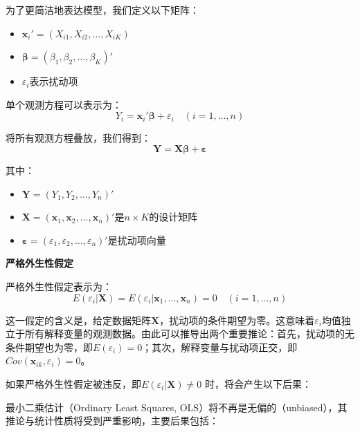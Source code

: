 为了更简洁地表达模型，我们定义以下矩阵：
\begin{itemize}
\item $\mathbf{x}_i' = (X_{i1}, X_{i2}, \ldots, X_{iK})$
\item $\boldsymbol{\beta} = (\beta_1, \beta_2, \ldots, \beta_K)'$
\item $\varepsilon_i$表示扰动项
\end{itemize}

单个观测方程可以表示为：
\begin{equation}
Y_i = \mathbf{x}_i' \boldsymbol{\beta} + \varepsilon_i \quad (i=1,\ldots,n) 
\end{equation}

将所有观测方程叠放，我们得到：
\begin{equation}
\mathbf{Y} = \mathbf{X} \boldsymbol{\beta} + \boldsymbol{\varepsilon}
\end{equation}

其中：
\begin{itemize}
\item $\mathbf{Y} = (Y_1, Y_2, \ldots, Y_n)'$
\item $\mathbf{X} = (\mathbf{x}_1, \mathbf{x}_2, \ldots, \mathbf{x}_n)'$是$n \times K$的设计矩阵
\item $\boldsymbol{\varepsilon} = (\varepsilon_1, \varepsilon_2, \ldots, \varepsilon_n)'$是扰动项向量
\end{itemize}

\textbf{严格外生性假定}

严格外生性假定表示为：
\begin{equation}
E(\varepsilon_i | \mathbf{X}) = E(\varepsilon_i | \mathbf{x}_1, \ldots, \mathbf{x}_n) = 0 \quad (i=1,\ldots,n)
\end{equation}

这一假定的含义是，给定数据矩阵$\mathbf{X}$，扰动项的条件期望为零。这意味着$\varepsilon_i$均值独立于所有解释变量的观测数据。由此可以推导出两个重要推论：首先，扰动项的无条件期望也为零，即$E(\varepsilon_i) = 0$；其次，解释变量与扰动项正交，即$Cov(\mathbf{x}_{ik}, \varepsilon_i) = 0$。

如果严格外生性假定被违反，即$E(\varepsilon_i|\mathbf{X}) \neq 0$ 时，将会产生以下后果：

最小二乘估计（Ordinary Least Squares, OLS）将不再是无偏的（unbiased），其推论与统计性质将受到严重影响，主要后果包括：

